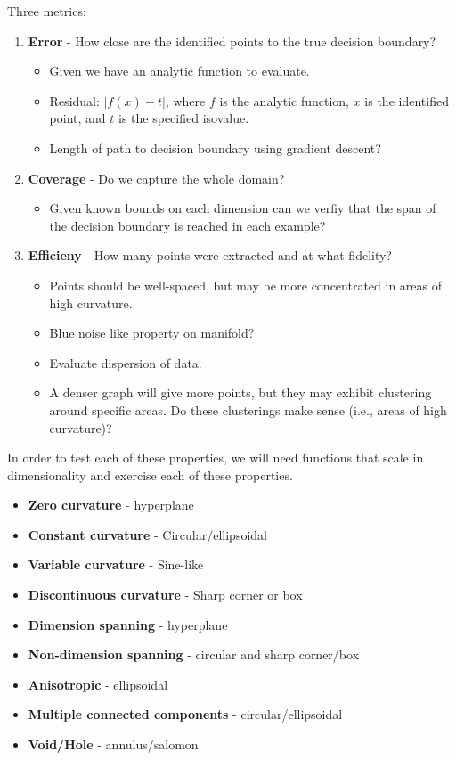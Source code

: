 \documentclass[12pt]{article}
\begin{document}
Three metrics:
\begin{enumerate}
	\item \textbf{Error} - How close are the identified points to the true
	decision boundary? 
	\begin{itemize}
		\item Given we have an analytic function to evaluate.
		\item Residual: $|f(x)-t|$, where $f$ is the analytic function, $x$ is
		the identified point, and $t$ is the specified isovalue.
		\item Length of path to decision boundary using gradient descent?
	\end{itemize}
	\item \textbf{Coverage} - Do we capture the whole domain?
	\begin{itemize}
		\item Given known bounds on each dimension can we verfiy that the span
		of the decision boundary is reached in each example?
	\end{itemize}
	\item \textbf{Efficieny} - How many points were extracted and at what
	fidelity?
	\begin{itemize}
		\item Points should be well-spaced, but may be more concentrated in
		areas of high curvature.
		\item Blue noise like property on manifold?
		\item Evaluate dispersion of data.
		\item A denser graph will give more points, but they may exhibit clustering around specific areas. Do these clusterings make sense (i.e., areas of high curvature)?
	\end{itemize}
\end{enumerate}

In order to test each of these properties, we will need functions that scale in dimensionality and exercise each of these properties.

\begin{itemize}
	\item \textbf{Zero curvature} - hyperplane 
	\item \textbf{Constant curvature} - Circular/ellipsoidal
	\item \textbf{Variable curvature} - Sine-like
	\item \textbf{Discontinuous curvature} - Sharp corner or box
\end{itemize}

\begin{itemize}
	\item \textbf{Dimension spanning} - hyperplane
	\item \textbf{Non-dimension spanning} - circular and sharp corner/box
	\item \textbf{Anisotropic} - ellipsoidal
	\item \textbf{Multiple connected components} - circular/ellipsoidal
	\item \textbf{Void/Hole} - annulus/salomon
\end{itemize}



\end{document}
